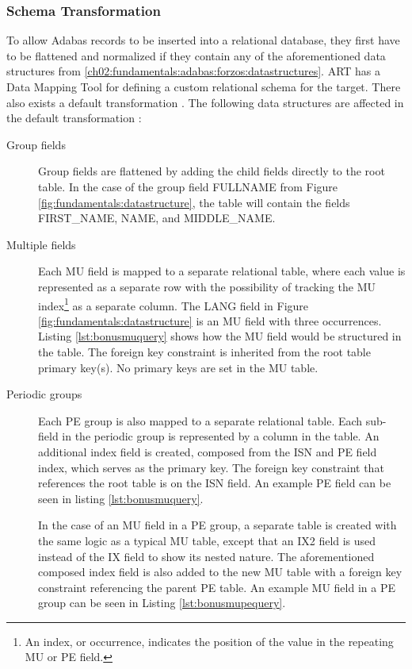 \subsubsection{Schema Transformation}
\label{ch02:fundamentals:adabas:art:schematransformation}
To allow Adabas records to be inserted into a relational database, they first have to be flattened and normalized if they contain any of the aforementioned data structures from \ref{ch02:fundamentals:adabas:forzos:datastructures}. \ac{ART} has a Data Mapping Tool for defining a custom relational schema for the target. There also exists a default transformation \cite{artconcepts}. The following data structures are affected in the default transformation \cite{artconcepts}:
\begin{description}
\item [Group fields]
Group fields are flattened by adding the child fields directly to the root table. In the case of the group field FULLNAME from Figure \ref{fig:fundamentals:datastructure}, the table will contain the fields FIRST\_NAME, NAME, and MIDDLE\_NAME.
\item [Multiple fields]
Each MU field is mapped to a separate relational table, where each value is represented as a separate row with the possibility of tracking the MU index\footnote{An index, or occurrence, indicates the position of the value in the repeating MU or PE field.} as a separate column. The LANG field in Figure \ref{fig:fundamentals:datastructure} is an MU field with three occurrences. Listing \ref{lst:bonusmuquery}  shows how the MU field would be structured in the table. The foreign key constraint is inherited from the root table primary key(s). No primary keys are set in the MU table.
\item[Periodic groups]
Each PE group is also mapped to a separate relational table. Each sub-field in the periodic group is represented by a column in the table. An additional index field is created, composed from the \ac{ISN} and PE field index, which serves as the primary key. The foreign key constraint that references the root table is on the \ac{ISN} field. An example PE field can be seen in listing \ref{lst:bonusmuquery}.

In the case of an MU field in a PE group, a separate table is created with the same logic as a typical MU table, except that an IX2 field is used instead of the IX field to show its nested nature. The aforementioned composed index field is also added to the new MU table with a foreign key constraint referencing the parent PE table. An example MU field in a PE group can be seen in Listing \ref{lst:bonusmupequery}.

\end{description}

